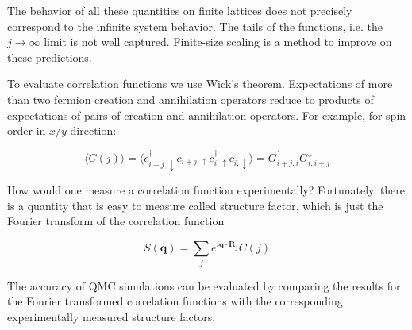The behavior of all these quantities on finite lattices does not precisely correspond to the infinite system behavior. The tails of the functions, i.e. the $j\rightarrow \infty$ limit is not well captured. Finite-size scaling is a method to improve on these predictions.

To evaluate correlation functions we use Wick's theorem. Expectations of more than two fermion creation and annihilation operators reduce to products of expectations of pairs of creation and annihilation operators. For example, for spin order in $x/y$ direction:

\begin{equation}
\big\langle C(j) \big\rangle = \big\langle c_{i+j, \downarrow}^\dagger c_{i+j, \uparrow} c_{i, \uparrow}^\dagger c_{i, \downarrow} \big\rangle = G_{i+j, i}^\uparrow G_{i, i + j}^\downarrow
\end{equation}

How would one measure a correlation function experimentally? Fortunately, there is a quantity that is easy to measure called structure factor, which is just the Fourier transform of the correlation function

\begin{equation}
S(\bm q) = \sum_j e^{i\bm q \cdot \bm R_j} C(j) 
\end{equation}

The accuracy of QMC simulations can be evaluated by comparing the results for the Fourier transformed correlation functions with the corresponding experimentally measured structure factors.